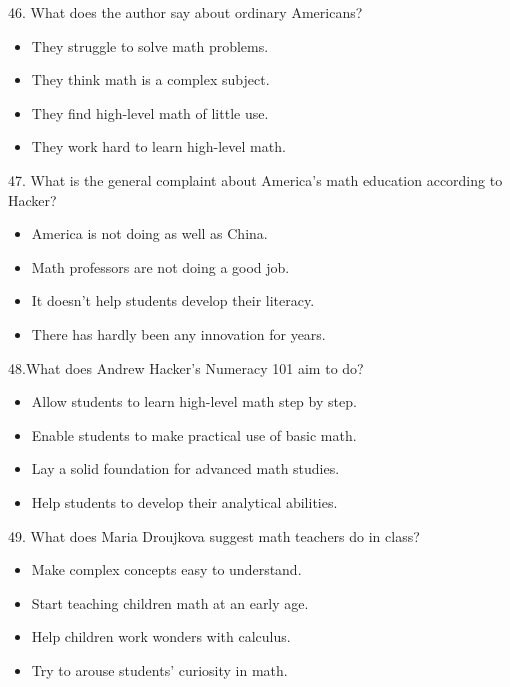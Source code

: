 \documentclass[UTF8,11pt]{ctexart}
\begin{document}
46. What does the author say about ordinary Americans?


\begin{itemize}[leftmargin=2em,itemsep=.2em,topsep=.4em]\item[A.] They struggle to solve math problems.
\item[B.] They think math is a complex subject.
\item[C.] They find high-level math of little use.
\item[D.] They work hard to learn high-level math.
\end{itemize}

47. What is the general complaint about America's math education according to Hacker?


\begin{itemize}[leftmargin=2em,itemsep=.2em,topsep=.4em]\item[A.] America is not doing as well as China.
\item[B.] Math professors are not doing a good job.
\item[C.] It doesn't help students develop their literacy.
\end{itemize}

\begin{itemize}[leftmargin=2em,itemsep=.2em,topsep=.4em]\item[D.] There has hardly been any innovation for years.
\end{itemize}

48.What does Andrew Hacker's Numeracy 101 aim to do?


\begin{itemize}[leftmargin=2em,itemsep=.2em,topsep=.4em]\item[A.] Allow students to learn high-level math step by step.
\item[B.] Enable students to make practical use of basic math.
\item[C.] Lay a solid foundation for advanced math studies.
\item[D.] Help students to develop their analytical abilities.
\end{itemize}

49. What does Maria Droujkova suggest math teachers do in class?


\begin{itemize}[leftmargin=2em,itemsep=.2em,topsep=.4em]\item[A.] Make complex concepts easy to understand.
\item[B.] Start teaching children math at an early age.
\item[C.] Help children work wonders with calculus.
\item[D.] Try to arouse students' curiosity in math.
\end{itemize}
\end{document}
